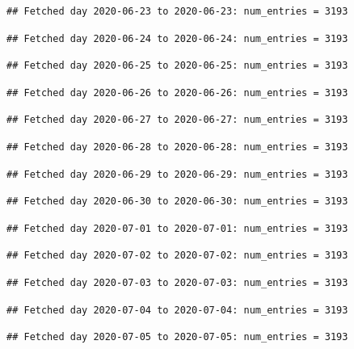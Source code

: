 \documentclass[]{article}
\begin{document}
\begin{verbatim}
## Fetched day 2020-06-23 to 2020-06-23: num_entries = 3193
\end{verbatim}

\begin{verbatim}
## Fetched day 2020-06-24 to 2020-06-24: num_entries = 3193
\end{verbatim}

\begin{verbatim}
## Fetched day 2020-06-25 to 2020-06-25: num_entries = 3193
\end{verbatim}

\begin{verbatim}
## Fetched day 2020-06-26 to 2020-06-26: num_entries = 3193
\end{verbatim}

\begin{verbatim}
## Fetched day 2020-06-27 to 2020-06-27: num_entries = 3193
\end{verbatim}

\begin{verbatim}
## Fetched day 2020-06-28 to 2020-06-28: num_entries = 3193
\end{verbatim}

\begin{verbatim}
## Fetched day 2020-06-29 to 2020-06-29: num_entries = 3193
\end{verbatim}

\begin{verbatim}
## Fetched day 2020-06-30 to 2020-06-30: num_entries = 3193
\end{verbatim}

\begin{verbatim}
## Fetched day 2020-07-01 to 2020-07-01: num_entries = 3193
\end{verbatim}

\begin{verbatim}
## Fetched day 2020-07-02 to 2020-07-02: num_entries = 3193
\end{verbatim}

\begin{verbatim}
## Fetched day 2020-07-03 to 2020-07-03: num_entries = 3193
\end{verbatim}

\begin{verbatim}
## Fetched day 2020-07-04 to 2020-07-04: num_entries = 3193
\end{verbatim}

\begin{verbatim}
## Fetched day 2020-07-05 to 2020-07-05: num_entries = 3193
\end{verbatim}
\end{document}
